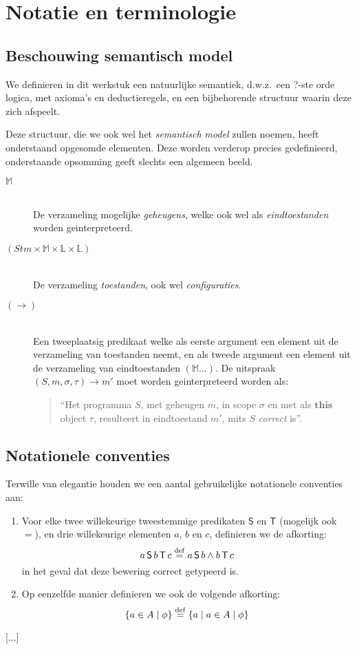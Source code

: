 
\chapter{Notatie en terminologie}

\section{Beschouwing semantisch model}

We definieren in dit werkstuk een natuurlijke semantiek, d.w.z.~een ?-ste orde logica, met axioma's en deductieregels, en een bijbehorende structuur waarin deze zich afspeelt.

Deze structuur, die we ook wel het \emph{semantisch model} zullen noemen, heeft onderstaand opgesomde elementen. Deze worden verderop precies gedefinieerd, onderstaande opsomming geeft slechts een algemeen beeld.

\begin{description}
	\item[$\mathbb{M}$]\hfill\\ De verzameling mogelijke \emph{geheugens}, welke ook wel als \emph{eindtoestanden} worden geinterpreteerd.
	\item[$(\mathit{Stm} \times \mathbb{M} \times \mathbb{L} \times \mathbb{L})$]\hfill\\ De verzameling \emph{toestanden}, ook wel \emph{configuraties}.
	\item[$(\longrightarrow)$]\hfill\\ Een tweeplaatsig predikaat welke als eerste argument een element uit de verzameling van toestanden neemt, en als tweede argument een element uit de verzameling van eindtoestanden $(\mathbb{M}\dots)$. De uitspraak $(S, m, \sigma, \tau) \longrightarrow m'$ moet worden geinterpreteerd worden als:
	\begin{quote} ``Het programma $S$, met geheugen $m$, in scope $\sigma$ en met als $\mathbf{this}$ object $\tau$, resulteert in eindtoestand $m'$, mits $S$ \emph{correct} is''. \end{quote}
\end{description}

\section{Notationele conventies}

Terwille van elegantie houden we een aantal gebruikelijke notationele conventies aan:

\begin{enumerate}
	\item Voor elke twee willekeurige tweestemmige predikaten $\mathsf{S}$ en $\mathsf{T}$ (mogelijk ook $=$), en drie willekeurige elementen $a$, $b$ en $c$, definieren we de afkorting: $$a \operatorname{\mathsf{S}} b \operatorname{\mathsf{T}} c \buildrel{\mathrm{def}}\over{=} a \operatorname{\mathsf{S}} b \land b \operatorname{\mathsf{T}} c$$ in het geval dat deze bewering correct getypeerd is.
	\item Op eenzelfde manier definieren we ook de volgende afkorting: $$ \{a \in A \mid \phi \} \buildrel{\mathrm{def}}\over{=} \{a \mid a \in A \mid \phi\}$$
\end{enumerate}

[...]
